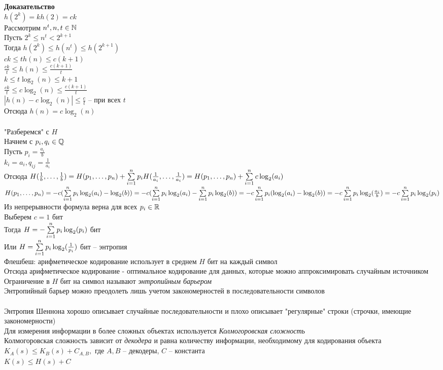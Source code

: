 \documentclass[12pt]{article}
\begin{document}
\textbf{Доказательство}\\
$h(2^k) = kh(2) = ck$\\
Рассмотрим $n^t, n,t \in \mathbb{N}$\\
Пусть $2^k \leq n^t < 2^{k+1}$\\
Тогда $h(2^k) \leq h(n^t) \leq h(2^{k+1})$\\
$ck \leq th(n) \leq c(k+1)$\\
$\frac{ck}t \leq h(n) \leq \frac{c(k+1)}t$\\
$k \leq t \log_2 (n) \leq k+1$\\
$\frac{ck}t \leq c \log_2(n) \leq \frac{c(k+1)}t$\\
$|h(n) - c\log_2(n)| \leq \frac ct$ -- при всех $t$\\
Отсюда $h(n) = c \log_2(n)$\\\\
"Разберемся" с $H$\\
Начнем с $p_i, q_i \in \mathbb{Q}$\\
Пусть $p_i = \frac{a_i}{b}$\\
$k_i = a_i, q_{ij} = \frac1{a_{i}}$\\
Отсюда $H(\frac1b, \ldots, \frac1b) = H(p_1, \ldots, p_n) + \sum\limits_{i=1}^n p_i H(\frac1{a_i}, \ldots, \frac1{a_i}) = H(p_1, \ldots, p_n) + \sum\limits_{i=1}^n c \log_2(a_i)$\\
$H(p_1, \ldots, p_n) = -c(\sum\limits_{i=1}^n p_i\log_2(a_i) - \log_2(b)) = -c(\sum\limits_{i=1}^n p_i\log_2(a_i) - \sum\limits_{i=1}^n p_i\log_2(b)) = -c\sum\limits_{i=1}^n p_i(\log_2 (a_i) - \log_2(b)) = -c\sum\limits_{i=1}^n p_i\log_2 (\frac{a_i}b) = -c\sum\limits_{i=1}^n p_i\log_2 (p_i)$\\
Из непрерывности формула верна для всех $p_i \in \mathbb{R}$\\
Выберем $c = 1$ бит\\
Тогда $H = -\sum\limits_{i=1}^n p_i\log_2 (p_i)$ бит\\
Или $H = \sum\limits_{i=1}^n p_i\log_2(\frac1{p_i})$ бит -- энтропия\\
Флешбеш: арифметическое кодирование использует в среднем $H$ бит на каждый символ\\
Отсюда арифметическое кодирование - оптимальное кодирование для данных, которые можно аппроксимировать случайным источником\\
Ограничение в $H$ бит на символ называют \textit{энтропийным барьером}\\
Энтропийный барьер можно преодолеть лишь учетом закономерностей в последовательности символов\\\\
Энтропия Шеннона хорошо описывает случайные последовательности и плохо описывает "регулярные" строки (строчки, имеющие закономерности)\\
Для измерения информации в более сложных объектах используется \textit{Колмогоровская сложность}\\
Колмогоровская сложность зависит от \textit{декодера} и равна количеству информации, необходимому для кодирования объекта\\
$K_A(s) \leq K_B(s) + C_{A,B},$ где $A, B$ -- декодеры, $C$ -- константа\\
$K(s) \leq H(s) + C$\\
\end{document}
